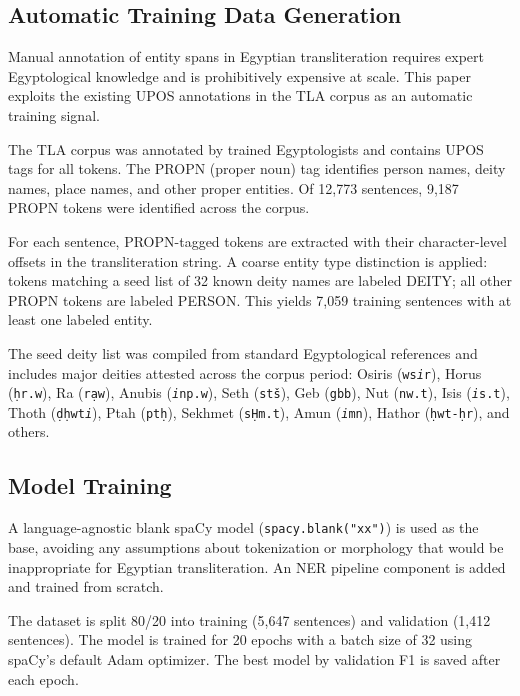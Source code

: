 \documentclass[11pt]{article}
\begin{document}
\subsection{Automatic Training Data Generation}

Manual annotation of entity spans in Egyptian transliteration requires expert Egyptological knowledge and is prohibitively expensive at scale. This paper exploits the existing UPOS annotations in the TLA corpus as an automatic training signal.

The TLA corpus was annotated by trained Egyptologists and contains UPOS tags for all tokens. The PROPN (proper noun) tag identifies person names, deity names, place names, and other proper entities. Of 12,773 sentences, 9,187 PROPN tokens were identified across the corpus.

For each sentence, PROPN-tagged tokens are extracted with their character-level offsets in the transliteration string. A coarse entity type distinction is applied: tokens matching a seed list of 32 known deity names are labeled DEITY; all other PROPN tokens are labeled PERSON. This yields 7,059 training sentences with at least one labeled entity.

The seed deity list was compiled from standard Egyptological references and includes major deities attested across the corpus period: Osiris (\texttt{ws\textit{i}r}), Horus (\texttt{\d{h}r.w}), Ra (\texttt{r\d{a}w}), Anubis (\texttt{\textit{i}np.w}), Seth (\texttt{st\v{s}}), Geb (\texttt{gbb}), Nut (\texttt{nw.t}), Isis (\texttt{\textit{i}s.t}), Thoth (\texttt{\d{d}\d{h}wt\textit{i}}), Ptah (\texttt{pt\d{h}}), Sekhmet (\texttt{s\d{H}m.t}), Amun (\texttt{\textit{i}mn}), Hathor (\texttt{\d{h}wt-\d{h}r}), and others.

\subsection{Model Training}

A language-agnostic blank spaCy model (\texttt{spacy.blank("xx")}) is used as the base, avoiding any assumptions about tokenization or morphology that would be inappropriate for Egyptian transliteration. An NER pipeline component is added and trained from scratch.

The dataset is split 80/20 into training (5,647 sentences) and validation (1,412 sentences). The model is trained for 20 epochs with a batch size of 32 using spaCy's default Adam optimizer. The best model by validation F1 is saved after each epoch.
\end{document}
